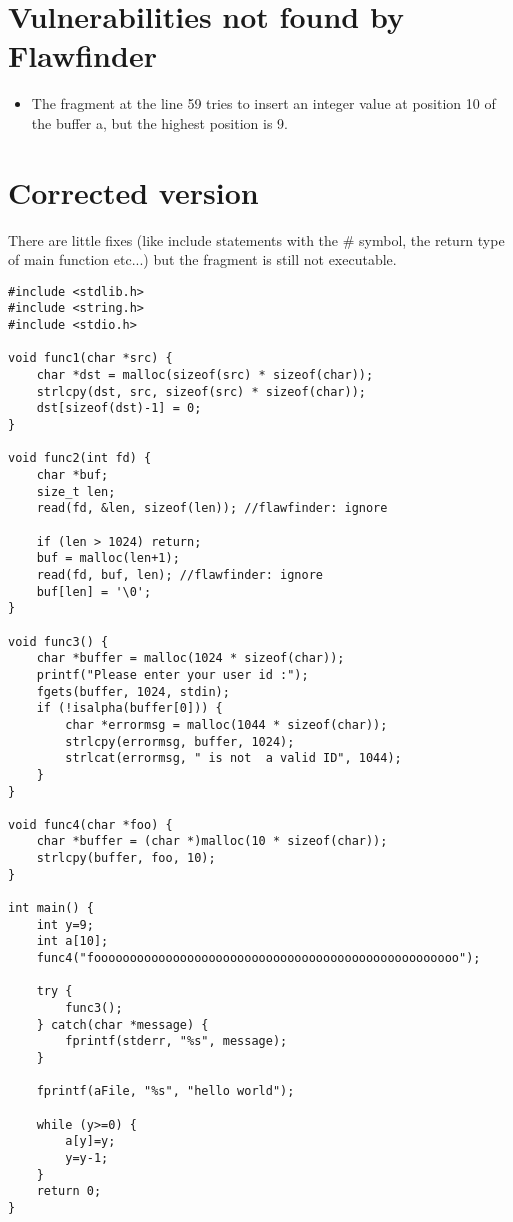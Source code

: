 \documentclass{article}
\begin{document}
\section{Vulnerabilities not found by Flawfinder}

\begin{itemize}

\item The fragment at the line 59 tries to insert an integer value at position 10 of the buffer a, but the highest position is 9.

\end{itemize}

\section{Corrected version}

There are little fixes (like include statements with the \# symbol, the return type of main function etc...) but the fragment is still not executable.

\begin{lstlisting}[style=CStyle]
#include <stdlib.h>
#include <string.h>
#include <stdio.h>

void func1(char *src) {
    char *dst = malloc(sizeof(src) * sizeof(char));
    strlcpy(dst, src, sizeof(src) * sizeof(char));
    dst[sizeof(dst)-1] = 0;
}

void func2(int fd) {
    char *buf;
    size_t len;
    read(fd, &len, sizeof(len)); //flawfinder: ignore

    if (len > 1024) return;
    buf = malloc(len+1); 
    read(fd, buf, len); //flawfinder: ignore
    buf[len] = '\0';
}

void func3() {  
    char *buffer = malloc(1024 * sizeof(char));
    printf("Please enter your user id :");
    fgets(buffer, 1024, stdin);
    if (!isalpha(buffer[0])) {
        char *errormsg = malloc(1044 * sizeof(char));
        strlcpy(errormsg, buffer, 1024);
        strlcat(errormsg, " is not  a valid ID", 1044);
    }
}

void func4(char *foo) {
    char *buffer = (char *)malloc(10 * sizeof(char));
    strlcpy(buffer, foo, 10);
}

int main() {
    int y=9;
    int a[10];
    func4("fooooooooooooooooooooooooooooooooooooooooooooooooooo");

    try {
        func3();
    } catch(char *message) {
        fprintf(stderr, "%s", message);
    }

    fprintf(aFile, "%s", "hello world");

    while (y>=0) {
        a[y]=y;
        y=y-1;
    }
    return 0;
}
\end{lstlisting}
\end{document}
